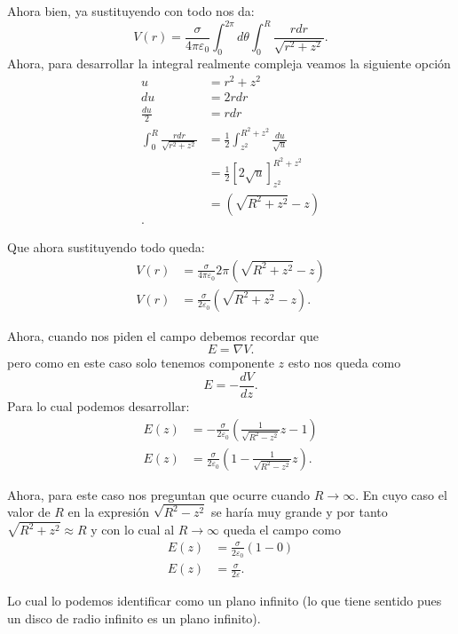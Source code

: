 \documentclass{report}
\begin{document}
Ahora bien, ya sustituyendo con todo nos da: \[
V\left( r \right) = \frac{\sigma}{4\pi\varepsilon_0}\int_{0}^{2\pi}d\theta \int_{0}^{R} \frac{r dr}{\sqrt{r^2 + z^2} }
.\] Ahora, para desarrollar la integral realmente compleja veamos la siguiente opción
\begin{align*}
  u &= r^2 + z^2 \\
  du &= 2r dr \\
  \frac{du}{2} &= r dr \\
  \int_{0}^{R} \frac{r dr}{\sqrt{r^2 + z^2} } &= \frac{1}{2}\int_{z^2}^{R^2 + z^2} \frac{du}{\sqrt{u} } \\
  &= \frac{1}{2}\left[ 2\sqrt{u}  \right]_{z^2}^{R^2 + z^2} \\
  &= \left( \sqrt{R^2 + z^2} - z \right)  \\
.\end{align*}

Que ahora  sustituyendo todo queda:
\begin{align*}
  V\left( r \right) &= \frac{\sigma}{4\pi\varepsilon_0} 2\pi \left( \sqrt{R^2 + z^2} - z  \right) \\
  V\left( r \right) &= \frac{\sigma}{2\varepsilon_0}\left( \sqrt{R^2 + z^2} - z \right) 
.\end{align*}

Ahora, cuando nos piden el campo debemos recordar que \[
E = \nabla V
.\] pero como en este caso solo tenemos componente $z$ esto nos queda como \[
E = - \frac{d V}{dz}
.\] Para lo cual podemos desarrollar:
\begin{align*}
  E\left( z \right) &= -\frac{\sigma}{2\varepsilon_0}\left( \frac{1}{\sqrt{R^2 - z^2} }z - 1 \right)  \\
  E\left( z \right) &= \frac{\sigma}{2\varepsilon_0}\left(1 - \frac{1}{ \sqrt{R^2 - z^2} }z \right)
.\end{align*}

Ahora, para este caso nos preguntan que ocurre cuando $R \to \infty$. En cuyo caso el valor de $R$ en la expresión $\sqrt{R^2 - z^2}$ se haría muy grande y por tanto $\sqrt{R^2 + z^2} \approx R $ y con lo cual al $R \to  \infty$ queda el campo como
\begin{align*}
  E\left( z \right) &= \frac{\sigma}{2\varepsilon_0} \left( 1 - 0 \right)  \\
  E\left( z \right) &= \frac{\sigma}{2\varepsilon}
.\end{align*}

Lo cual lo podemos identificar como un plano infinito (lo que tiene sentido pues un disco de radio infinito es un plano infinito).
\end{document}
